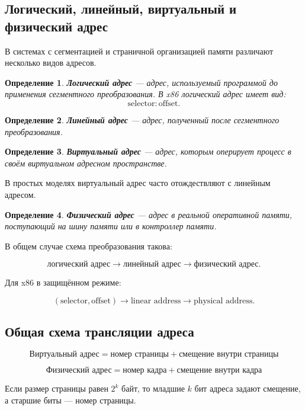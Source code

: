 \documentclass[a4paper,12pt]{article}
\newtheorem{definition}{Определение}
\begin{document}
\subsection{Логический, линейный, виртуальный и физический адрес}

В системах с сегментацией и страничной организацией памяти различают несколько видов адресов.

\begin{definition}
\textbf{Логический адрес} --- адрес, используемый программой до применения сегментного преобразования. В x86 логический адрес имеет вид:
\[
\text{selector} : \text{offset}.
\]
\end{definition}

\begin{definition}
\textbf{Линейный адрес} --- адрес, полученный после сегментного преобразования.
\end{definition}

\begin{definition}
\textbf{Виртуальный адрес} --- адрес, которым оперирует процесс в своём виртуальном адресном пространстве.
\end{definition}

В простых моделях виртуальный адрес часто отождествляют с линейным адресом.

\begin{definition}
\textbf{Физический адрес} --- адрес в реальной оперативной памяти, поступающий на шину памяти или в контроллер памяти.
\end{definition}

В общем случае схема преобразования такова:

\[
\text{логический адрес}
\rightarrow
\text{линейный адрес}
\rightarrow
\text{физический адрес}.
\]

Для x86 в защищённом режиме:

\[
(\text{selector}, \text{offset})
\rightarrow
\text{linear address}
\rightarrow
\text{physical address}.
\]

\subsection{Общая схема трансляции адреса}

\[
\boxed{
\text{Виртуальный адрес}
=
\text{номер страницы}
+
\text{смещение внутри страницы}
}
\]

\[
\boxed{
\text{Физический адрес}
=
\text{номер кадра}
+
\text{смещение внутри кадра}
}
\]

Если размер страницы равен $2^k$ байт, то младшие $k$ бит адреса задают смещение, а старшие биты --- номер страницы.
\end{document}
